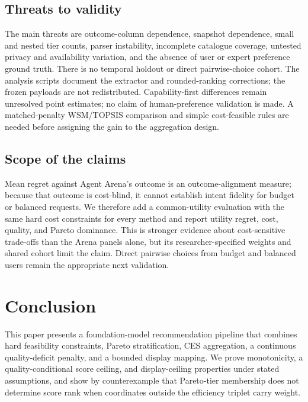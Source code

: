 \documentclass[pdflatex,sn-mathphys-num]{sn-jnl}
\theoremstyle{thmstyleone}
\theoremstyle{thmstylethree}
\begin{document}
\subsection{Threats to validity}\label{subsec:threats}

The main threats are outcome-column dependence, snapshot dependence, small and nested tier counts, parser instability, incomplete catalogue coverage, untested privacy and availability variation, and the absence of user or expert preference ground truth. There is no temporal holdout or direct pairwise-choice cohort. The analysis scripts document the extractor and rounded-ranking corrections; the frozen payloads are not redistributed. Capability-first differences remain unresolved point estimates; no claim of human-preference validation is made. A matched-penalty WSM/TOPSIS comparison and simple cost-feasible rules are needed before assigning the gain to the aggregation design.

\subsection{Scope of the claims}\label{subsec:claims}

Mean regret against Agent Arena's outcome is an outcome-alignment measure; because that outcome is cost-blind, it cannot establish intent fidelity for budget or balanced requests. We therefore add a common-utility evaluation with the same hard cost constraints for every method and report utility regret, cost, quality, and Pareto dominance. This is stronger evidence about cost-sensitive trade-offs than the Arena panels alone, but its researcher-specified weights and shared cohort limit the claim. Direct pairwise choices from budget and balanced users remain the appropriate next validation.

\section{Conclusion}\label{sec:conclusion}

This paper presents a foundation-model recommendation pipeline that combines hard feasibility constraints, Pareto stratification, CES aggregation, a continuous quality-deficit penalty, and a bounded display mapping. We prove monotonicity, a quality-conditional score ceiling, and display-ceiling properties under stated assumptions, and show by counterexample that Pareto-tier membership does not determine score rank when coordinates outside the efficiency triplet carry weight.
\end{document}
